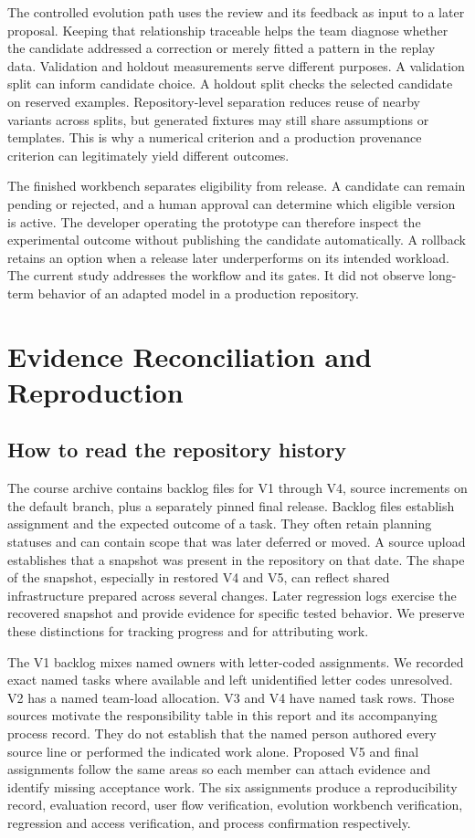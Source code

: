 \documentclass[journal,compsoc]{IEEEtran}
\begin{document}
The controlled evolution path uses the review and its feedback as input to a later proposal. Keeping that relationship traceable helps the team diagnose whether the candidate addressed a correction or merely fitted a pattern in the replay data. Validation and holdout measurements serve different purposes. A validation split can inform candidate choice. A holdout split checks the selected candidate on reserved examples. Repository-level separation reduces reuse of nearby variants across splits, but generated fixtures may still share assumptions or templates. This is why a numerical criterion and a production provenance criterion can legitimately yield different outcomes.

The finished workbench separates eligibility from release. A candidate can remain pending or rejected, and a human approval can determine which eligible version is active. The developer operating the prototype can therefore inspect the experimental outcome without publishing the candidate automatically. A rollback retains an option when a release later underperforms on its intended workload. The current study addresses the workflow and its gates. It did not observe long-term behavior of an adapted model in a production repository.

\section{Evidence Reconciliation and Reproduction}
\subsection{How to read the repository history}
The course archive contains backlog files for V1 through V4, source increments on the default branch, plus a separately pinned final release. Backlog files establish assignment and the expected outcome of a task. They often retain planning statuses and can contain scope that was later deferred or moved. A source upload establishes that a snapshot was present in the repository on that date. The shape of the snapshot, especially in restored V4 and V5, can reflect shared infrastructure prepared across several changes. Later regression logs exercise the recovered snapshot and provide evidence for specific tested behavior. We preserve these distinctions for tracking progress and for attributing work.

The V1 backlog mixes named owners with letter-coded assignments. We recorded exact named tasks where available and left unidentified letter codes unresolved. V2 has a named team-load allocation. V3 and V4 have named task rows. Those sources motivate the responsibility table in this report and its accompanying process record. They do not establish that the named person authored every source line or performed the indicated work alone. Proposed V5 and final assignments follow the same areas so each member can attach evidence and identify missing acceptance work. The six assignments produce a reproducibility record, evaluation record, user flow verification, evolution workbench verification, regression and access verification, and process confirmation respectively.
\end{document}
